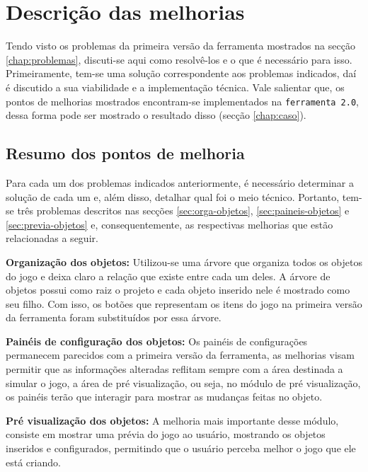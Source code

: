 \documentclass[12pt,oneside,openright,a4paper,english,brazil,sumario=tradicional]{abntex2}
\begin{document}
\chapter{Descrição das melhorias} %
\label{chap:melhorias}
Tendo visto os problemas da primeira versão da ferramenta mostrados na secção \ref{chap:problemas}, discuti-se aqui como resolvê-los e o que é necessário para isso. Primeiramente, tem-se uma solução correspondente aos problemas indicados, daí é discutido a sua viabilidade e a implementação técnica. Vale salientar que, os pontos de melhorias mostrados encontram-se implementados na \texttt{ferramenta 2.0}, dessa forma pode ser mostrado o resultado disso (secção \ref{chap:caso}).

\section{Resumo dos pontos de melhoria}
Para cada um dos problemas indicados anteriormente, é necessário determinar a solução de cada um e, além disso, detalhar qual foi o meio técnico. Portanto, tem-se três problemas descritos nas secções \ref{sec:orga-objetos}, \ref{sec:paineis-objetos} e \ref{sec:previa-objetos} e, consequentemente, as respectivas melhorias que estão relacionadas a seguir.

\begin{alineas}
\item \textbf{Organização dos objetos:} Utilizou-se uma árvore que organiza todos os objetos do jogo e deixa claro a relação que existe entre cada um deles. A árvore de objetos possui como raiz o projeto e cada objeto inserido nele é mostrado como seu filho.  Com isso, os botões que representam os itens do jogo na primeira versão da ferramenta foram substituídos por essa árvore.
\item \textbf{Painéis de configuração dos objetos:} Os painéis de configurações permanecem parecidos com a primeira versão da ferramenta, as melhorias visam permitir que as informações alteradas reflitam sempre com a área destinada a simular o jogo, a área de pré visualização, ou seja, no módulo de pré visualização, os painéis terão que interagir para mostrar as mudanças feitas no objeto.
\item \textbf{Pré visualização dos objetos:} A melhoria mais importante desse módulo, consiste em mostrar uma prévia do jogo ao usuário, mostrando os objetos inseridos e configurados, permitindo que o usuário perceba melhor o jogo que ele está criando.
\end{alineas}
\end{document}
